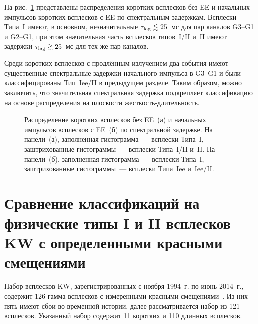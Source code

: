 На рис.~\ref{img:LagDistrs} представлены распределения коротких всплесков без EE и 
начальных импульсов коротких всплесков с EE по спектральным задержкам. 
Всплески Типа~I имеют, в основном, незначительные $\tau_{\mathrm{lag}}\lesssim 25$~мс для 
пар каналов G3--G1 и G2--G1, при этом значительная часть всплесков типов~I/II и~II 
имеют задержки $\tau_{\mathrm{lag}}\gtrsim 25$~мс для тех же пар каналов.

Среди коротких всплесков с продлённым излучением два события имеют существенные  %
спектральные задержки начального импульса в G3--G1 и были классифицированы Тип~Iee/II в предыдущем разделе. 
Таким образом, можно заключить, что значительная спектральная задержка подкрепляет классификацию 
на основе распределения на плоскости жесткость-длительность.

\begin{figure}[h]
  \begin{minipage}[h]{0.5\textwidth}
  \end{minipage}
  \hfill
  \begin{minipage}[h]{0.5\textwidth}
  \end{minipage}
  \caption{Распределение коротких всплесков без EE~(а) и начальных импульсов 
  всплесков с EE~(б) по спектральной задержке.
  На панели~(а), заполненная гистограмма~--- всплески Типа~I, заштрихованные 
  гистограммы~--- всплески Типа~I/II и~II.  На панели~(б), заполненная 
  гистограмма~--- всплески Типа~I, заштрихованные гистограммы~--- всплески Типа~Iee и~Iee/II.}
  \label{img:LagDistrs}  
\end{figure}

\FloatBarrier

\section{Сравнение классификаций на физические типы I и II всплесков KW 
с определенными красными смещениями}\label{sec:Phys_Classification}
Набор всплесков KW, зарегистрированных с ноября 1994~г. по июнь 2014~г., 
содержит 126 гамма-всплесков с измеренными красными смещениями~\citep{Tsvetkova_KW_GRBs_with_z}. 
Из них пять имеют сбои во временной истории, далее рассматривается набор из 121 всплесков. 
Указанный набор содержит 11 коротких и 110 длинных всплесков. 

